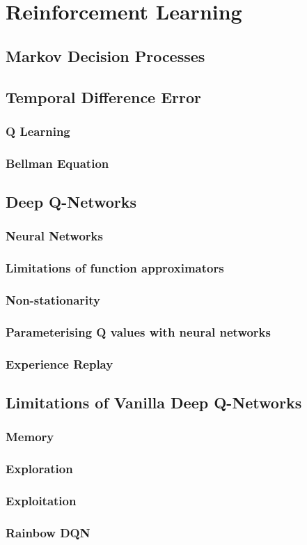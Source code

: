 \section{Reinforcement Learning}
\subsection{Markov Decision Processes}
\subsection{Temporal Difference Error}
\subsubsection{Q Learning}
\subsubsection{Bellman Equation}
\subsection{Deep Q-Networks}
\subsubsection{Neural Networks}
\subsubsection{Limitations of function approximators}
\subsubsection{Non-stationarity}
\subsubsection{Parameterising Q values with neural networks}
\subsubsection{Experience Replay}
\subsection{Limitations of Vanilla Deep Q-Networks}
\subsubsection{Memory}
\subsubsection{Exploration}
\subsubsection{Exploitation}
\subsubsection{Rainbow DQN}